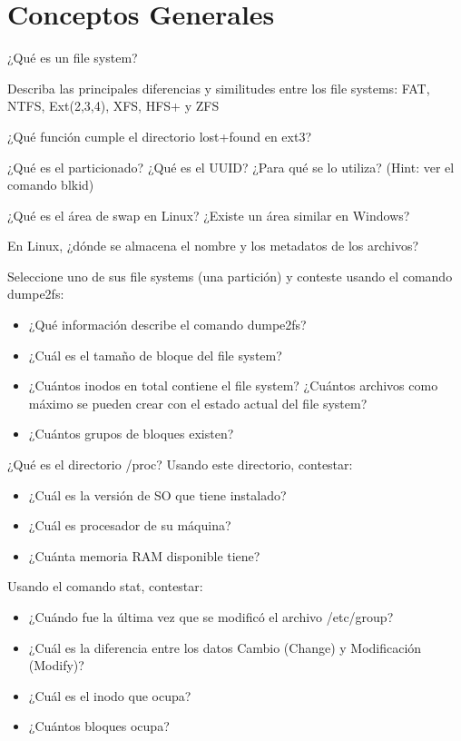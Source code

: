 \section{Conceptos Generales}
\begin{questions}
  \question ¿Qué es un file system? 

  \question Describa las principales diferencias y similitudes entre los file systems: FAT, NTFS, Ext(2,3,4), XFS, HFS+ y ZFS

  \question ¿Qué función cumple el directorio lost+found en ext3? 

  \question ¿Qué es el particionado? ¿Qué es el UUID? ¿Para qué se lo utiliza? (Hint: ver el comando blkid)
  
  \question ¿Qué es el área de swap en Linux? ¿Existe un área similar en Windows?

  \question En Linux, ¿dónde se almacena el nombre y los metadatos de los archivos?

  \question Seleccione uno de sus file systems (una partición) y conteste usando el comando dumpe2fs:
  \begin{itemize}
   \item ¿Qué información describe el comando dumpe2fs?
   \item ¿Cuál es el tamaño de bloque del file system?
   \item ¿Cuántos inodos en total contiene el file system? ¿Cuántos archivos como máximo se pueden crear
    con el estado actual del file system? 
   \item ¿Cuántos grupos de bloques existen? 
  \end{itemize}

  \question ¿Qué es el directorio /proc? Usando este directorio, contestar: 
   \begin{itemize}
    \item ¿Cuál es la versión de SO que tiene instalado?
    \item ¿Cuál es procesador de su máquina? 
    \item ¿Cuánta memoria RAM disponible tiene? 
   \end{itemize}
 
  \question Usando el comando stat, contestar:
    \begin{itemize}
     \item ¿Cuándo fue la última vez que se modificó el archivo /etc/group? 
     \item ¿Cuál es la diferencia entre los datos Cambio (Change) y Modificación (Modify)? 
     \item ¿Cuál es el inodo que ocupa? 
     \item ¿Cuántos bloques ocupa?
    \end{itemize}


\end{questions}
